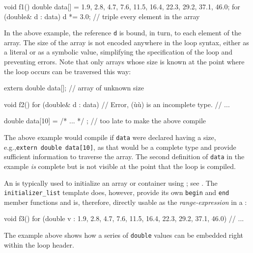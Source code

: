 {{\begin{emcppslisting}
void f1()
{
    double data[] = {1.9, 2.8, 4.7, 7.6, 11.5, 16.4, 22.3, 29.2, 37.1, 46.0};
    for (double& d : data)
    {
        d *= 3.0;  // triple every element in the array
    }
}
\end{emcppslisting}
    

\noindent In the above example, the reference \lstinline!d! is bound, in turn, to
each element of the array. The size of the array is not encoded anywhere
in the loop syntax, either as a literal or as a symbolic value,
simplifying the specification of the loop and preventing errors. Note
that only arrays whose size is known at the point where the loop occurs
can be traversed this way:

\begin{emcppslisting}
extern double data[];  // array of unknown size

void f2()
{
    for (double& d : data)  // Error, (ù{}ù) is an incomplete type.
    {
        // ...
    }
}

double data[10] = { /* ... */ };  // too late to make the above compile
\end{emcppslisting}
    

\noindent The above example would compile if \lstinline!data! were declared having a
size, e.g.,\linebreak[4] \lstinline!extern!~\lstinline!double!~\lstinline!data[10]!, as that
would be a complete type and provide sufficient information to traverse
the array. The second definition of \lstinline!data! in the example
\emph{is} complete but is not visible at the point that the loop is
compiled.

An  is typically used to initialize an array or
container using ; see . The \lstinline!initializer_list! template does,
however, provide its own \lstinline!begin! and \lstinline!end! member
functions and is, therefore, directly usable as the
\emph{range-expression} in a :

\begin{emcppslisting}
void f3()
{
    for (double v : {1.9, 2.8, 4.7, 7.6, 11.5, 16.4, 22.3, 29.2, 37.1, 46.0})
    {
        // ...
    }
}
\end{emcppslisting}
    

\noindent The example above shows how a series of \lstinline!double! values can be
embedded right within the loop header.

}}
